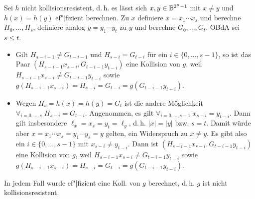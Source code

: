 \begin{Beweis}
    Sei $h$ nicht kollisionsresistent,
    d.\,h. es lässt sich $x, y \in \mathbb{B}^{2^n-1}$ mit
    $x \not= y$ und $h(x) = h(y)$ ef"|fizient berechnen.
    Zu $x$ definiere $\overline{x} = x_1 \dotsb x_s$ und berechne $H_0, \dotsc, H_s$,
    definiere analog $\overline{y} = y_1 \dotsb y_t$ zu $y$ und berechne $G_0, \dotsc, G_t$.
    OBdA sei $s \le t$.
    \begin{itemize}
        \item
        Gilt $H_{s-i-1} \not= G_{t-i-1}$ und $H_{s-i} = G_{t-i}$ für ein
        $i \in \{0, \dotsc, s-1\}$,
        so ist das Paar $(H_{s-i-1} x_{s-i}, G_{t-i-1} y_{t-i})$ eine Kollision von $g$, weil\\
        $H_{s-i-1} x_{s-i} \not= G_{t-i-1} y_{t-i}$ sowie
        $g(H_{s-i-1} x_{s-i}) = H_{s-i} = G_{t-i} = g(G_{t-i-1} y_{t-i})$.
        
        \item
        Wegen $H_s = h(x) = h(y) = G_t$
        ist die andere Möglichkeit $\forall_{i=0,\dotsc,s}\; H_{s-i} = G_{t-i}$.
        Angenommen, es gilt $\forall_{i=0,\dotsc,s-1}\; x_{s-i} = y_{t-i}$.
        Dann gilt insbesondere $\ell_x = x_s = y_t = \ell_y$, d.\,h.
        $|x| = |y|$ bzw. $s = t$.
        Damit würde aber $x = x_1 \dotsb x_s = y_1 \dotsb y_s = y$ gelten,
        ein Widerspruch zu $x \not= y$.
        Es gibt also ein $i \in \{0, \dotsc, s-1\}$ mit $x_{s-i} \not= y_{t-i}$.
        Dann ist $(H_{s-i-1} x_{s-i}, G_{t-i-1} y_{t-i})$ eine Kollision von $g$, weil
        $H_{s-i-1} x_{s-i} \not= G_{t-i-1} y_{t-i}$ sowie
        $g(H_{s-i-1} x_{s-i}) = H_{s-i} = G_{t-i} = g(G_{t-i-1} y_{t-i})$.
    \end{itemize}
    In jedem Fall wurde ef"|fizient eine Koll. von $g$ berechnet, d.\,h. $g$ ist nicht
    kollisionsresistent.
\end{Beweis}

\pagebreak

